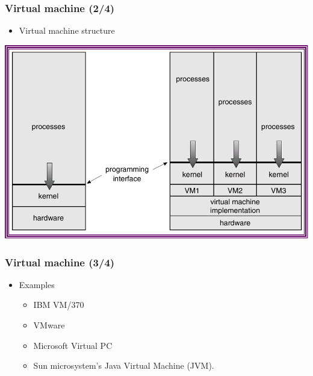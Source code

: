 \documentclass[CJKutf8,xcolor=pdftex,dvipsnames,table]{beamer}
\begin{document}
\begin{CJK*}{UTF8}{song}
  \begin{frame}
    \frametitle{Virtual machine (2/4)} \pause
    \begin{itemize}
    \item{Virtual machine structure} \pause
    \end{itemize}
    \begin{center}
      \includegraphics[scale=0.6]{v6f3-11} \pause
    \end{center}
  \end{frame}

  \begin{frame}
    \frametitle{Virtual machine (3/4)} \pause
    \begin{itemize}
    \item{Examples} \pause
      \begin{itemize}
      \item{IBM VM/370} \pause
      \item{VMware} \pause
      \item{Microsoft Virtual PC} \pause
      \item{Sun microsystem's Java Virtual Machine (JVM).}
      \end{itemize}
    \end{itemize}
  \end{frame}
  
  \iffalse


\end{CJK*}
\end{document}
